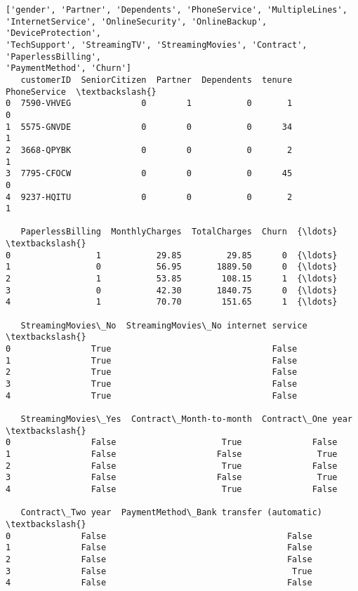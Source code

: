 \documentclass[11pt]{article}
\begin{document}
    \begin{Verbatim}[commandchars=\\\{\}]
['gender', 'Partner', 'Dependents', 'PhoneService', 'MultipleLines',
'InternetService', 'OnlineSecurity', 'OnlineBackup', 'DeviceProtection',
'TechSupport', 'StreamingTV', 'StreamingMovies', 'Contract', 'PaperlessBilling',
'PaymentMethod', 'Churn']
   customerID  SeniorCitizen  Partner  Dependents  tenure  PhoneService  \textbackslash{}
0  7590-VHVEG              0        1           0       1             0
1  5575-GNVDE              0        0           0      34             1
2  3668-QPYBK              0        0           0       2             1
3  7795-CFOCW              0        0           0      45             0
4  9237-HQITU              0        0           0       2             1

   PaperlessBilling  MonthlyCharges  TotalCharges  Churn  {\ldots}  \textbackslash{}
0                 1           29.85         29.85      0  {\ldots}
1                 0           56.95       1889.50      0  {\ldots}
2                 1           53.85        108.15      1  {\ldots}
3                 0           42.30       1840.75      0  {\ldots}
4                 1           70.70        151.65      1  {\ldots}

   StreamingMovies\_No  StreamingMovies\_No internet service  \textbackslash{}
0                True                                False
1                True                                False
2                True                                False
3                True                                False
4                True                                False

   StreamingMovies\_Yes  Contract\_Month-to-month  Contract\_One year  \textbackslash{}
0                False                     True              False
1                False                    False               True
2                False                     True              False
3                False                    False               True
4                False                     True              False

   Contract\_Two year  PaymentMethod\_Bank transfer (automatic)  \textbackslash{}
0              False                                    False
1              False                                    False
2              False                                    False
3              False                                     True
4              False                                    False


\end{Verbatim}
\end{document}
